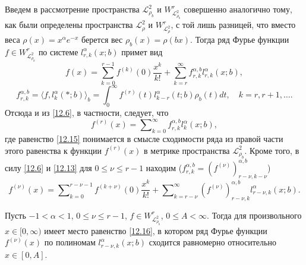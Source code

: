 Введем в рассмотрение пространства $\mathcal{L}_{\rho_b}^2$ и $W^r_{\mathcal{L}_{\rho_b}^2}$ совершенно аналогично тому, как были определены пространства $\mathcal{L}_{\rho}^2$ и $W^r_{\mathcal{L}_{\rho}^2}$, с той лишь разницей, что вместо веса $\rho(x)=x^\alpha e^{-x}$ берется вес $\rho_b(x)=\rho(bx)$.  Тогда ряд Фурье функции $f\in W^r_{\mathcal{L}_{\rho_b}^2}$ по системе  $l_{r,k}^\alpha(x;b)$ примет вид
\begin{equation}\label{12.13}
f(x)= \sum_{k=0}^{r-1} f^{(k)}(0)\frac{x^k}{k!}+ \sum_{k=r}^\infty {f}_{r,k}^{\alpha,b} {l}_{r,k}^\alpha(x;b),
\end{equation}
\begin{equation}\label{12.14}
{f}_{r,k}^{\alpha,b}=\langle f,l_{k}^\alpha(*;b) \rangle_b=\int_{0}^\infty f^{(r)}(t){l}_{k-r}^\alpha(t;b)\rho_b(t)dt, \quad k=r,r+1,\ldots.
\end{equation}
Отсюда и из \eqref{12.6}, в частности, следует, что
\begin{equation}\label{12.15}
f^{(r)}(x)=  \sum\nolimits_{k=0}^\infty f_{r,k}^{\alpha,b} l_{k}^\alpha(x;b),
\end{equation}
где равенство \eqref{12.15} понимается в смысле сходимости ряда из правой части этого равенства  к функции $f^{(r)}(x)$ в метрике пространства $\mathcal{L}_{\rho_b}^2$. Кроме того,  в силу \eqref{12.6} и \eqref{12.13} для $0\le\nu\le r-1$ находим
(${f}_{r,k}^{\alpha,b}=(f^{(\nu)})_{r-\nu,k-\nu}^{\alpha,b} $)
\begin{equation}\label{12.16}
f^{(\nu)}(x)= \sum\nolimits_{k=0}^{r-\nu-1} f^{(k+\nu)}(0)\frac{x^k}{k!}+ \sum\nolimits_{k=r-\nu}^\infty (f^{(\nu)})_{r-\nu,k}^{\alpha,b} l_{r-\nu,k}^\alpha(x;b).
\end{equation}

\begin{theorem}\label{cor12.1}
	Пусть $-1<\alpha<1$, $0\le\nu\le r-1$, $f\in W^r_{\mathcal{L}_{\rho_b}^2}$, $0\le A<\infty$. Тогда для произвольного $x\in[0,\infty)$ имеет место равенство \eqref{12.16}, в котором ряд Фурье функции $f^{(\nu)}(x)$ по полиномам $l_{r-\nu,k}^\alpha(x;b)$ сходится равномерно относительно $x\in[0,A]$.
\end{theorem}




